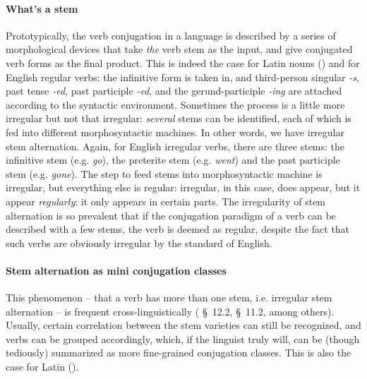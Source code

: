 \documentclass[a4paper, oneside, 12pt]{report}
\newcommand*{\citesec}[1]{\S~{#1}}
\newcommand{\form}[1]{\emph{#1}}
\begin{document}
{\paragraph{What's a stem} Prototypically, the verb conjugation in a language is described by 
a series of morphological devices that take \emph{the} verb stem as the input,
and give conjugated verb forms as the final product.
This is indeed the case for Latin nouns ()
and for English regular verbs:
the infinitive form is taken in,
and third-person singular \form{-s}, past tense \form{-ed}, 
past participle \form{-ed}, and the gerund-participle \form{-ing}
are attached according to the syntactic environment.
Sometimes the process is a little more irregular but not that irregular:
\emph{several} stems can be identified, each of which is fed into different morphosyntactic machines.
In other words, we have irregular stem alternation.
Again, for English irregular verbs,
there are three stems: the infinitive stem (e.g. \form{go}), 
the preterite stem (e.g. \form{went})
and the past participle stem (e.g. \form{gone}).
The step to feed stems into morphosyntactic machine is irregular,
but everything else is regular:
irregular, in this case, does appear, but it appear \emph{regularly}:
it only appears in certain parts.
The irregularity of stem alternation is so prevalent
that if the conjugation paradigm of a verb can be described with a few stems,
the verb is deemed as regular, 
despite the fact that such verbs are obviously irregular by the standard of English.

\paragraph{Stem alternation as mini conjugation classes} 
This phenomenon -- that a verb has more than one stem, i.e. irregular stem alternation
-- is frequent cross-linguistically
(\citealt{jacques2021grammar} \citesec{12.2}, \citealt{forker2020grammar} \citesec{11.2}, among others).
Usually, certain correlation between the stem varieties can still be recognized,
and verbs can be grouped accordingly,
which, if the linguist truly will, 
can be (though tediously) summarized as more fine-grained conjugation classes.
This is also the case for Latin ().

}
\end{document}
